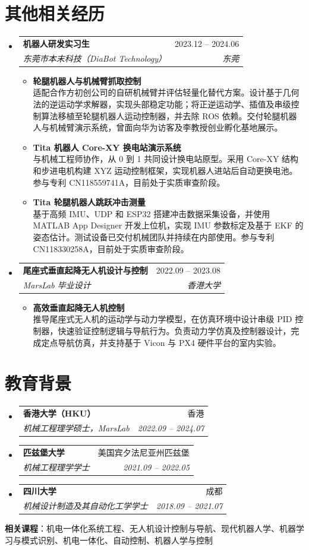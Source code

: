 \documentclass[letterpaper,11pt]{article}
\makeatletter
\newcommand{\resumeItem}[1]{
  \item\small{
    {#1 \vspace{-2pt}}
  }
}
\newcommand{\resumeSubheading}[4]{
  \vspace{-2pt}\item
    \begin{tabular*}{0.97\textwidth}[t]{l@{\extracolsep{\fill}}r}
      \textbf{#1} & #2 \\
      \textit{\small#3} & \textit{\small #4} \\
    \end{tabular*}\vspace{-7pt}
}
\newcommand{\resumeSubHeadingListStart}{\begin{itemize}[leftmargin=0.15in, label={}]}
\newcommand{\resumeSubHeadingListEnd}{\end{itemize}}
\newcommand{\resumeItemListStart}{\begin{itemize}}
\newcommand{\resumeItemListEnd}{\end{itemize}\vspace{-5pt}}
\makeatother
\begin{document}
\section{其他相关经历}
  \resumeSubHeadingListStart
    \resumeSubheading
      {机器人研发实习生}{2023.12 -- 2024.06}
      {东莞市本末科技（DiaBot Technology）}{东莞}
      \resumeItemListStart
        \resumeItem{\normalsize{\textbf{轮腿机器人与机械臂抓取控制}} \\
        \small{适配合作方初创公司的自研机械臂并评估轻量化替代方案。设计基于几何法的逆运动学求解器，实现头部稳定功能；将正逆运动学、插值及串级控制算法移植至轮腿机器人运动控制器，并去除 ROS 依赖。交付轮腿机器人与机械臂演示系统，曾面向华为访客及李教授创业孵化基地展示。}}
        \resumeItem{\normalsize{\textbf{Tita 机器人 Core-XY 换电站演示系统}} \\
        \small{与机械工程师协作，从 0 到 1 共同设计换电站原型。采用 Core-XY 结构和步进电机构建 XYZ 运动控制框架，实现机器人进站后自动更换电池。参与专利 CN118559741A，目前处于实质审查阶段。}}
        \resumeItem{\normalsize{\textbf{Tita 轮腿机器人跳跃冲击测量}} \\
        \small{基于高频 IMU、UDP 和 ESP32 搭建冲击数据采集设备，并使用 MATLAB App Designer 开发上位机，实现 IMU 参数标定及基于 EKF 的姿态估计。测试设备已交付机械团队并持续在内部使用。参与专利 CN118330258A，目前处于实质审查阶段。}}
      \resumeItemListEnd

    \resumeSubheading
      {尾座式垂直起降无人机设计与控制}{2022.09 -- 2023.08}
      {MarsLab 毕业设计}{香港大学}
      \resumeItemListStart
        \resumeItem{\normalsize{\textbf{高效垂直起降无人机控制}} \\
        \small{推导尾座式无人机的运动学与动力学模型，在仿真环境中设计串级 PID 控制器，快速验证控制逻辑与导航行为。负责动力学仿真及控制器设计，完成定点导航仿真，并支持基于 Vicon 与 PX4 硬件平台的室内实验。}}
      \resumeItemListEnd
  \resumeSubHeadingListEnd

\section{教育背景}
  \resumeSubHeadingListStart
    \resumeSubheading
      {香港大学（HKU）}{香港}
      {机械工程理学硕士，MarsLab}{2022.09 -- 2024.07}
    \resumeSubheading
      {匹兹堡大学}{美国宾夕法尼亚州匹兹堡}
      {机械工程理学学士}{2021.09 -- 2022.05}
    \resumeSubheading
      {四川大学}{成都}
      {机械设计制造及其自动化工学学士}{2018.09 -- 2021.07}
  \resumeSubHeadingListEnd
  \begin{itemize}[leftmargin=0.15in, label={}]
    \small{\item{
      \textbf{相关课程}{：机电一体化系统工程、无人机设计控制与导航、现代机器人学、机器学习与模式识别、机电一体化、自动控制、机器人学与控制}
    }}
  \end{itemize}
\end{document}
